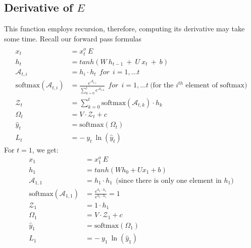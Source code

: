 \documentclass{article}
\begin{document}
\subsection{Derivative of $E$}
This function employs recursion, therefore, computing its derivative may take some time. Recall our forward pass formulas
\begin{align*} \\
    x_t &= x^o_t ~ E \\
        h_t &= tanh(W ~h_{t-1}~+~U~x_t ~+~b)\\
	\mathcal{A}_{t,i} &= h_i  \cdot h_t~~for~~ i =1, \ldots t\\
\text{softmax}(\mathcal{A}_{t,i}) &= \frac{e^{\mathcal{A}_{t,i }}}{\sum_{k=0}^{t} e^{\mathcal{A}_{t,k}}} ~~for~~ i =1, \ldots t ~\text{(for the $i^{th}$ element of softmax)}\\
\mathcal{Z}_t &= \sum_{k=0}^{t}  \text{softmax}(\mathcal{A}_{t,k}) \cdot h_k \\
\Omega_t &= V \cdot \mathcal{Z}_t + c\\
\hat{y}_t &= \text{softmax}(\Omega_t)\\
        L_t &= -~y_t~\ln{(\hat{y}_t)}
\end{align*}
\newpage
For $t=1$, we get:
\begin{align*}
    x_1 &= x^o_1 ~ E \\
	h_1 &= tanh(W h_0 +Ux_1 +b)\\
 \mathcal{A}_{1,1} &= h_1 \cdot h_1  ~~\text{(since there is only one element in $h_1$)}\\
\text{softmax}(\mathcal{A}_{1,1}) &= \frac{e^{h_1 \cdot h_1 }}{ e^{h_1 \cdot h_1} } =1 \\
\mathcal{Z}_1 &= 1 \cdot h_1\\
\Omega_1 &= V \cdot \mathcal{Z}_1 + c\\
\hat{y}_1 &= \text{softmax}(\Omega_1)\\
        L_1 &= -~y_1~\ln{(\hat{y}_1)}
\end{align*}
\end{document}

